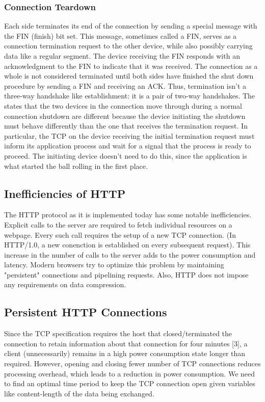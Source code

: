 \documentclass{sigplanconf}
\begin{document}
\subsubsection{Connection Teardown}
Each side terminates its end of the connection by sending a special message with the FIN (finish) bit set. This message, sometimes called a FIN, serves as a connection termination request to the other device, while also possibly carrying data like a regular segment. The device receiving the FIN responds with an acknowledgment to the FIN to indicate that it was received. The connection as a whole is not considered terminated until both sides have finished the shut down procedure by sending a FIN and receiving an ACK.
Thus, termination isn't a three-way handshake like establishment: it is a pair of two-way handshakes. The states that the two devices in the connection move through during a normal connection shutdown are different because the device initiating the shutdown must behave differently than the one that receives the termination request. In particular, the TCP on the device receiving the initial termination request must inform its application process and wait for a signal that the process is ready to proceed. The initiating device doesn't need to do this, since the application is what started the ball rolling in the first place.
\subsection{Inefficiencies of HTTP}
The HTTP protocol as it is implemented today has some notable inefficiencies. Explicit calls to the server are required to fetch individual resources on a webpage. Every such call requires the setup of a new TCP connection. (In HTTP/1.0, a new conenction is established on every subsequent request). This increase in the number of calls to the server adds to the power consumption and latency. Modern browsers try to  optimize this problem by maintaining "persistent" connections and pipelining requests. Also, HTTP does not  impose any requirements on data compression.
\subsection{Persistent HTTP Connections}

Since the TCP specification requires the host that closed/terminated the connection to retain information about that connection for four minutes [3], a client (unnecessarily) remains in a high power consumption state longer than required. However, opening and closing fewer number of TCP connections reduces processing overhead, which leads to a reduction in power consumption. We need to find an optimal time period to keep the TCP connection open given variables like content-length of the data being exchanged. 
\end{document}
